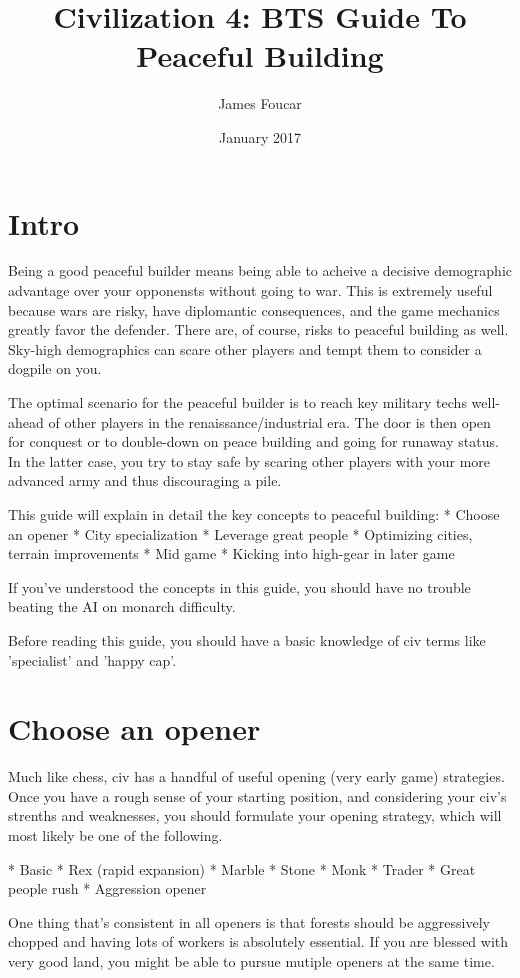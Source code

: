 \documentclass[10pt]{article}
\title{Civilization 4: BTS Guide To Peaceful Building}
\author{James Foucar}
\date{January 2017}
\begin{document}
\section*{Intro}

Being a good peaceful builder means being able to acheive a decisive demographic advantage
over your opponensts without going to war. This is extremely useful because wars are risky, have
diplomantic consequences, and the game mechanics greatly favor the defender. There are, of course,
risks to peaceful building as well. Sky-high demographics can scare other players and tempt them
to consider a dogpile on you.

The optimal scenario for the peaceful builder is to reach key military
techs well-ahead of other players in the renaissance/industrial era. The door is then open for conquest
or to double-down on peace building and going for runaway status. In the latter case, you try to stay
safe by scaring other players with your more advanced army and thus discouraging a pile.

This guide will explain in detail the key concepts to peaceful building:
* Choose an opener
* City specialization
* Leverage great people
* Optimizing cities, terrain improvements
* Mid game
* Kicking into high-gear in later game

If you've understood the concepts in this guide, you should have no trouble beating the AI
on monarch difficulty.

Before reading this guide, you should have a basic knowledge of civ terms like 'specialist'
and 'happy cap'.

\section*{Choose an opener}

Much like chess, civ has a handful of useful opening (very early game) strategies. Once you
have a rough sense of your starting position, and considering your civ's strenths and weaknesses,
you should formulate your opening strategy, which will most likely be one of the following.

* Basic
* Rex (rapid expansion)
* Marble
* Stone
* Monk
* Trader
* Great people rush
* Aggression opener

One thing that's consistent in all openers is that forests should be aggressively chopped and
having lots of workers is absolutely essential. If you are blessed with very good land, you
might be able to pursue mutiple openers at the same time.
\end{document}
